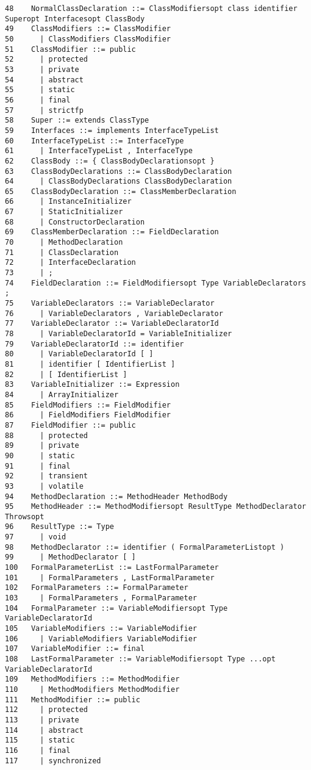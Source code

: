 {\begin{verbatim}
48    NormalClassDeclaration ::= ClassModifiersopt class identifier Superopt Interfacesopt ClassBody
49    ClassModifiers ::= ClassModifier
50      | ClassModifiers ClassModifier
51    ClassModifier ::= public
52      | protected
53      | private
54      | abstract
55      | static
56      | final
57      | strictfp
58    Super ::= extends ClassType
59    Interfaces ::= implements InterfaceTypeList
60    InterfaceTypeList ::= InterfaceType
61      | InterfaceTypeList , InterfaceType
62    ClassBody ::= { ClassBodyDeclarationsopt }
63    ClassBodyDeclarations ::= ClassBodyDeclaration
64      | ClassBodyDeclarations ClassBodyDeclaration
65    ClassBodyDeclaration ::= ClassMemberDeclaration
66      | InstanceInitializer
67      | StaticInitializer
68      | ConstructorDeclaration
69    ClassMemberDeclaration ::= FieldDeclaration
70      | MethodDeclaration
71      | ClassDeclaration
72      | InterfaceDeclaration
73      | ;
74    FieldDeclaration ::= FieldModifiersopt Type VariableDeclarators ;
75    VariableDeclarators ::= VariableDeclarator
76      | VariableDeclarators , VariableDeclarator
77    VariableDeclarator ::= VariableDeclaratorId
78      | VariableDeclaratorId = VariableInitializer
79    VariableDeclaratorId ::= identifier
80      | VariableDeclaratorId [ ]
81      | identifier [ IdentifierList ]
82      | [ IdentifierList ]
83    VariableInitializer ::= Expression
84      | ArrayInitializer
85    FieldModifiers ::= FieldModifier
86      | FieldModifiers FieldModifier
87    FieldModifier ::= public
88      | protected
89      | private
90      | static
91      | final
92      | transient
93      | volatile
94    MethodDeclaration ::= MethodHeader MethodBody
95    MethodHeader ::= MethodModifiersopt ResultType MethodDeclarator Throwsopt
96    ResultType ::= Type
97      | void
98    MethodDeclarator ::= identifier ( FormalParameterListopt )
99      | MethodDeclarator [ ]
100   FormalParameterList ::= LastFormalParameter
101     | FormalParameters , LastFormalParameter
102   FormalParameters ::= FormalParameter
103     | FormalParameters , FormalParameter
104   FormalParameter ::= VariableModifiersopt Type VariableDeclaratorId
105   VariableModifiers ::= VariableModifier
106     | VariableModifiers VariableModifier
107   VariableModifier ::= final
108   LastFormalParameter ::= VariableModifiersopt Type ...opt VariableDeclaratorId
109   MethodModifiers ::= MethodModifier
110     | MethodModifiers MethodModifier
111   MethodModifier ::= public
112     | protected
113     | private
114     | abstract
115     | static
116     | final
117     | synchronized

\end{verbatim}}
